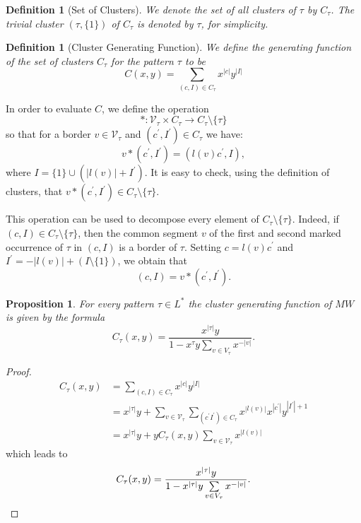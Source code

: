 \documentclass[12pt]{report}
\newtheorem{prop}{Proposition}
\newtheorem{defn}[mythm]{Definition}
\begin{document}
{{\begin{defn}[Set of Clusters]
We denote the set of all clusters of $\tau$ by $C_\tau$. The trivial cluster $(\tau, \{1\})$ of $C_\tau$ is denoted by $\tau$, for simplicity.
\end{defn}

\begin{defn}[Cluster Generating Function]
We define the generating function of the set of clusters $C_\tau$ for the pattern $\tau$ to be
\[ C(x,y) = \sum\limits_{(c,I) \in C_\tau} x^{|c|} y^{|I|} \]
\end{defn}

\noindent In order to evaluate $C$, we define the operation
\[ * : \mathcal{V}_\tau \times C_\tau \to C_\tau \setminus \{\tau \} \]
so that for a border $v \in \mathcal{V}_{\tau}$ and $(c^\prime, I^\prime) \in C_\tau$ we have:
\[ v * (c^\prime, I^\prime) = (l(v) c^\prime, I), \]
where $I = \{1\} \cup (|l(v)| + I^\prime)$. It is easy to check, using the definition of clusters, that $v * (c^\prime, I^\prime) \in C_\tau \setminus \{\tau\}$.

This operation can be used to decompose every element of $C_\tau \setminus \{\tau\}$. Indeed, if $(c, I) \in C_\tau \setminus \{\tau\}$, then the common segment $v$ of the first and second marked occurrence of $\tau$ in $(c,I)$ is a border of $\tau$. Setting $c = l(v) c^\prime$ and $I^\prime = -|l(v)| + (I \setminus \{1\})$, we obtain that
\[ (c,I) = v * (c^\prime, I^\prime). \]

\begin{prop} For every pattern $\tau \in L^*$ the cluster generating function of $MW$ is given by the formula
\[ C_\tau(x,y) = \frac{x^{|\tau|} y}{1 - x^{\tau} y \sum\limits_{v \in V_\tau} x^{-|v|}}.\]
\end{prop}

\begin{proof}
\begin{align*}
C_\tau(x,y) 
& = \sum\limits_{(c,I) \in C_\tau} x^{|c|} y^{|I|} \\
& = x^{|\tau|} y + \sum\limits_{v \in \mathcal{V}_\tau} \sum\limits_{(c^\prime I^\prime) \in C_\tau} x^{|l(v)|} x^{|c^\prime|} y^{|I^\prime|+1} \\
& = x^{|\tau|} y + y C_\tau(x,y) \sum\limits_{v \in \mathcal{V}_\tau} x^{|l(v)|}
\end{align*}
which leads to
\[ C_\tau(x,y) = \frac{x^{|\tau|} y}{1 - x^{|\tau|} y \sum\limits_{v \in V_\tau} x^{-|v|}}. \qedhere \]
\end{proof}

}}
\end{document}
